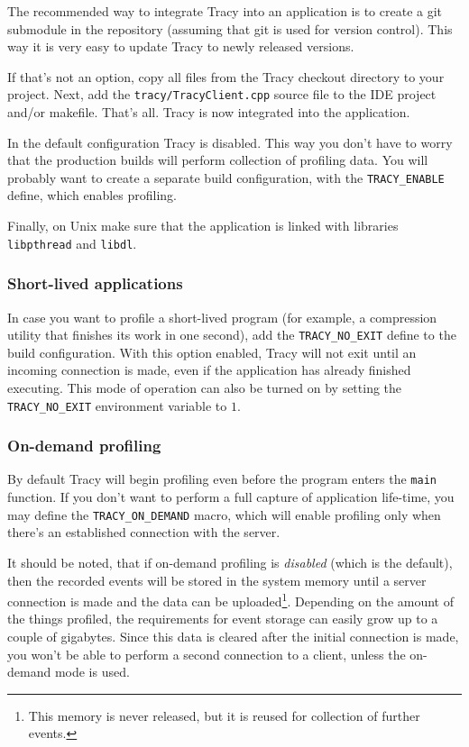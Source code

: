 \documentclass[hidelinks,titlepage,a4paper]{article}
\begin{document}
The recommended way to integrate Tracy into an application is to create a git submodule in the repository (assuming that git is used for version control). This way it is very easy to update Tracy to newly released versions.

If that's not an option, copy all files from the Tracy checkout directory to your project. Next, add the \texttt{tracy/TracyClient.cpp} source file to the IDE project and/or makefile. That's all. Tracy is now integrated into the application.

In the default configuration Tracy is disabled. This way you don't have to worry that the production builds will perform collection of profiling data. You will probably want to create a separate build configuration, with the \texttt{TRACY\_ENABLE} define, which enables profiling.

Finally, on Unix make sure that the application is linked with libraries \texttt{libpthread} and \texttt{libdl}.

\subsubsection{Short-lived applications}

In case you want to profile a short-lived program (for example, a compression utility that finishes its work in one second), add the \texttt{TRACY\_NO\_EXIT} define to the build configuration. With this option enabled, Tracy will not exit until an incoming connection is made, even if the application has already finished executing. This mode of operation can also be turned on by setting the \texttt{TRACY\_NO\_EXIT} environment variable to $1$.

\subsubsection{On-demand profiling}
\label{ondemand}

By default Tracy will begin profiling even before the program enters the \texttt{main} function. If you don't want to perform a full capture of application life-time, you may define the \texttt{TRACY\_ON\_DEMAND} macro, which will enable profiling only when there's an established connection with the server.

It should be noted, that if on-demand profiling is \emph{disabled} (which is the default), then the recorded events will be stored in the system memory until a server connection is made and the data can be uploaded\footnote{This memory is never released, but it is reused for collection of further events.}. Depending on the amount of the things profiled, the requirements for event storage can easily grow up to a couple of gigabytes. Since this data is cleared after the initial connection is made, you won't be able to perform a second connection to a client, unless the on-demand mode is used.
\end{document}
